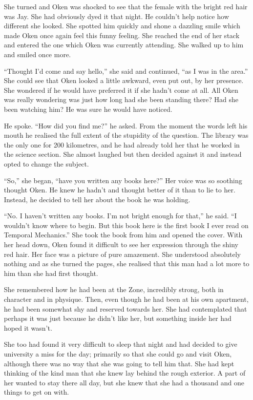 She turned and Oken was shocked to see that the female with the bright red hair was Jay.  She had obviously dyed it that night.  He couldn't help notice how different she looked.  She spotted him quickly and shone a dazzling smile which made Oken once again feel this funny feeling.  She reached the end of her stack and entered the one which Oken was currently attending.  She walked up to him and smiled once more.

``Thought I'd come and say hello,'' she said and continued, ``as I was in the area.''  She could see that Oken looked a little awkward, even put out, by her presence.  She wondered if he would have preferred it if she hadn't come at all.  All Oken was really wondering was just how long had she been standing there?  Had she been watching him?  He was sure he would have noticed.

He spoke.  ``How did you find me?'' he asked.  From the moment the words left his mouth he realised the full extent of the stupidity of the question.  The library was the only one for 200 kilometres, and he had already told her that he worked in the science section.  She almost laughed but then decided against it and instead opted to change the subject.

``So,'' she began, ``have you written any books here?''  Her voice was so soothing thought Oken.  He knew he hadn't and thought better of it than to lie to her.  Instead, he decided to tell her about the book he was holding.

``No.  I haven't written any books.  I'm not bright enough for that,'' he said.  ``I wouldn't know where to begin.  But this book here is the first book I ever read on Temporal Mechanics.''  She took the book from him and opened the cover.  With her head down, Oken found it difficult to see her expression through the shiny red hair.  Her face was a picture of pure amazement.  She understood absolutely nothing and as she turned the pages, she realised that this man had a lot more to him than she had first thought.

She remembered how he had been at the Zone, incredibly strong, both in character and in physique.  Then, even though he had been at his own apartment, he had been somewhat shy and reserved towards her.  She had contemplated that perhaps it was just because he didn't like her, but something inside her had hoped it wasn't.

She too had found it very difficult to sleep that night and had decided to give university a miss for the day; primarily so that she could go and visit Oken, although there was no way that she was going to tell him that.  She had kept thinking of the kind man that she knew lay behind the rough exterior.  A part of her wanted to stay there all day, but she knew that she had a thousand and one things to get on with.

